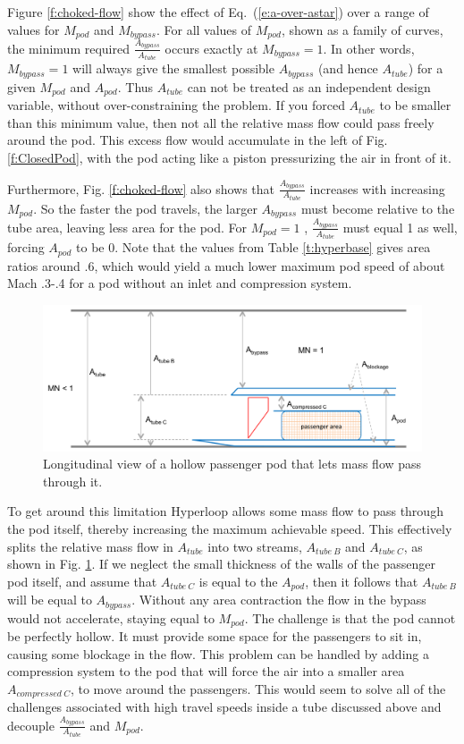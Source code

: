 \documentclass[heading.tex]{subfiles}
\begin{document}
Figure \ref{f:choked-flow} show the effect of Eq.~(\ref{e:a-over-astar}) over a range of values for $M_{pod}$ and $M_{bypass}$. 
For all values of $M_{pod}$, shown as a family of curves, the minimum required $\frac{A_{bypass}}{A_{tube}}$ occurs exactly at $M_{bypass}=1$.
In other words, 
$M_{bypass}=1$ will always give the smallest possible $A_{bypass}$ (and hence $A_{tube}$) for a given 
$M_{pod}$ and $A_{pod}$. Thus $A_{tube}$ can not be treated as an independent design variable, without over-constraining the problem.
If you forced $A_{tube}$ to be smaller than this minimum value, then not all the relative mass flow could pass freely around the pod. This excess 
flow would accumulate in the left of Fig. \ref{f:ClosedPod}, with the pod acting like a piston pressurizing the 
air in front of it. 

Furthermore, Fig. \ref{f:choked-flow} also shows that $\frac{A_{bypass}}{A_{tube}}$ 
increases with increasing $M_{pod}$. So the faster the pod travels, the larger $A_{bypass}$ 
must become relative to the tube area, leaving less area for the pod. For $M_{pod} = 1$ , $\frac{A_{bypass}}{A_{tube}}$ must 
equal 1 as well, forcing $A_{pod}$ to be 0. Note that the values from Table \ref{t:hyperbase} gives area ratios around .6, 
which would yield a much lower maximum pod speed of about Mach .3-.4 for a pod without an inlet and compression system. 

\begin{figure}[hbtp]
\centering
\includegraphics[width=.85\textwidth]{images/podB}
\caption{Longitudinal view of a hollow passenger pod that lets mass flow pass through it.}
\label{f:hollowPod}
\end{figure}

To get around this limitation Hyperloop allows some mass flow to pass through the pod itself, thereby increasing
the maximum achievable speed. This effectively splits the relative mass flow in $A_{tube}$ into two streams, 
$A_{tube\ B}$ and  $A_{tube\ C}$, as shown in Fig. \ref{f:hollowPod}. If we neglect the small thickness of the walls of
the passenger pod itself, and assume that $A_{tube\ C}$ is equal to the $A_{pod}$, then it follows that $A_{tube\ B}$ 
will be equal to $A_{bypass}$. Without any area contraction the flow in the bypass would not accelerate, staying 
equal to $M_{pod}$. The challenge is that the pod cannot be perfectly hollow. It must provide some space for the passengers
to sit in, causing some blockage in the flow. This problem can be handled by adding a compression system to the 
pod that will force the air into a smaller area $A_{compressed\ C}$, to move around the passengers. This would 
seem to solve all of the challenges associated with high travel speeds inside a tube discussed above and decouple 
$\frac{A_{bypass}}{A_{tube}}$ and ${M_{pod}}$.
\end{document}

